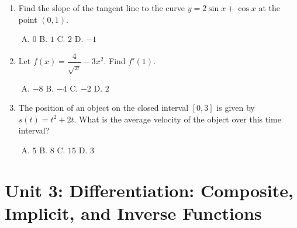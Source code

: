 \documentclass[11pt,a4paper]{article}
\begin{document}
\begin{enumerate}[1.]
    \item Find the slope of the tangent line to the curve $y = 2\sin x + \cos x$ at the point $(0, 1)$.
    \begin{enumerate}[A.]
        \item $0$ \qquad B. $1$ \qquad C. $2$ \qquad D. $-1$
    \end{enumerate}

    \item Let $f(x) = \dfrac{4}{\sqrt{x}} - 3x^2$. Find $f'(1)$.
    \begin{enumerate}[A.]
        \item $-8$ \qquad B. $-4$ \qquad C. $-2$ \qquad D. $2$
    \end{enumerate}

    \item The position of an object on the closed interval $[0, 3]$ is given by $s(t) = t^2 + 2t$. What is the average velocity of the object over this time interval?
    \begin{enumerate}[A.]
        \item $5$ \qquad B. $8$ \qquad C. $15$ \qquad D. $3$
    \end{enumerate}
\end{enumerate}

\newpage

\section*{Unit 3: Differentiation: Composite, Implicit, and Inverse Functions}
\end{document}
